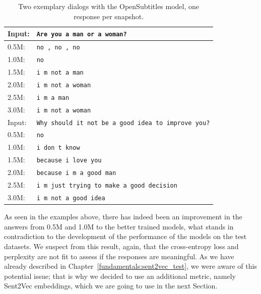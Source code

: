 \begin{table}[H]
	\centering
	\begin{adjustbox}{max width=\textwidth}
		\begin{tabularx}{\textwidth}{lX}
			\toprule
			Input: 	& \texttt{Are you a man or a woman?}\\
			\midrule
			0.5M: 	& \texttt{no , no , no}\\
			1.0M: 	& \texttt{no}\\
			1.5M:	& \texttt{i m not a man}\\
			2.0M:	& \texttt{i m not a woman}\\
			2.5M:	& \texttt{i m a man}\\
			3.0M:	& \texttt{i m not a woman}\\
			\midrule
			Input: 	& \texttt{Why should it not be a good idea to improve you?}\\
			\midrule
			0.5M: 	& \texttt{no}\\
			1.0M: 	& \texttt{i don t know}\\
			1.5M:	& \texttt{because i love you}\\
			2.0M:	& \texttt{because i m a good man}\\
			2.5M:	& \texttt{i m just trying to make a good decision}\\
			3.0M:	& \texttt{i m not a good idea}\\
			\bottomrule
		\end{tabularx}
	\end{adjustbox}
	\caption{Two exemplary dialogs with the OpenSubtitles model, one response per snapshot.}
	\label{results:example_output:opensubtitles}
\end{table}

As seen in the examples above, there has indeed been an improvement in the answers from 0.5M and 1.0M to the better trained models, what stands in contradiction to the development of the performance of the models on the test datasets. We suspect from this result, again, that the cross-entropy loss and perplexity are not fit to assess if the responses are meaningful. As we have already described in Chapter~\ref{fundamentals:sent2vec_test}, we were aware of this potential issue; that is why we decided to use an additional metric, namely Sent2Vec embeddings, which we are going to use in the next Section.

